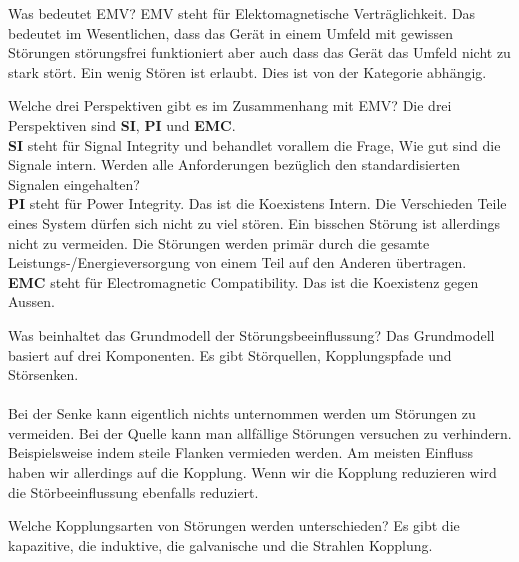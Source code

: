 
\begin{karte}{Was bedeutet EMV?}
	EMV steht für Elektomagnetische Verträglichkeit. Das bedeutet im Wesentlichen, dass das Gerät in einem Umfeld mit gewissen Störungen störungsfrei funktioniert aber auch dass das Gerät das Umfeld nicht zu stark stört. Ein wenig Stören ist erlaubt. Dies ist von der Kategorie abhängig.
\end{karte}

\begin{karte}{Welche drei Perspektiven gibt es im Zusammenhang mit EMV?}
	Die drei Perspektiven sind \textbf{SI}, \textbf{PI} und \textbf{EMC}.\\[5pt]
	\textbf{SI} steht für Signal Integrity und behandlet vorallem die Frage, Wie gut sind die Signale intern. Werden alle Anforderungen bezüglich den standardisierten Signalen eingehalten?\\[5pt]
	\textbf{PI} steht für Power Integrity. Das ist die Koexistens Intern. Die Verschieden Teile eines System dürfen sich nicht zu viel stören. Ein bisschen Störung ist allerdings nicht zu vermeiden. Die Störungen werden primär durch die gesamte Leistungs-/Energieversorgung von einem Teil auf den Anderen übertragen.\\[5pt]
	\textbf{EMC} steht für Electromagnetic Compatibility. Das ist die Koexistenz gegen Aussen.
\end{karte}

\begin{karte}{Was beinhaltet das Grundmodell der Störungsbeeinflussung?}
	Das Grundmodell basiert auf drei Komponenten. Es gibt Störquellen, Kopplungspfade und Störsenken.\\
	\\[5pt]
	Bei der Senke kann eigentlich nichts unternommen werden um Störungen zu vermeiden. Bei der Quelle kann man allfällige Störungen versuchen zu verhindern. Beispielsweise indem steile Flanken vermieden werden. Am meisten Einfluss haben wir allerdings auf die Kopplung. Wenn wir die Kopplung reduzieren wird die Störbeeinflussung ebenfalls reduziert.
\end{karte}

\begin{karte}{Welche Kopplungsarten von Störungen werden unterschieden?}
	Es gibt die kapazitive, die induktive, die galvanische und die Strahlen Kopplung.
\end{karte}
